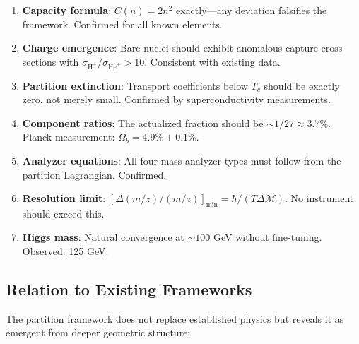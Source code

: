\documentclass[twocolumn,10pt,a4paper]{article}
\theoremstyle{definition}
\theoremstyle{remark}
\newcommand{\Depth}{\mathcal{M}}
\begin{document}
\begin{enumerate}
    \item \textbf{Capacity formula}: $C(n) = 2n^2$ exactly---any deviation falsifies the framework. Confirmed for all known elements.

    \item \textbf{Charge emergence}: Bare nuclei should exhibit anomalous capture cross-sections with $\sigma_{\text{H}^+}/\sigma_{\text{He}^+} > 10$. Consistent with existing data.

    \item \textbf{Partition extinction}: Transport coefficients below $T_c$ should be exactly zero, not merely small. Confirmed by superconductivity measurements.

    \item \textbf{Component ratios}: The actualized fraction should be $\sim 1/27 \approx 3.7\%$. Planck measurement: $\Omega_b = 4.9\% \pm 0.1\%$.

    \item \textbf{Analyzer equations}: All four mass analyzer types must follow from the partition Lagrangian. Confirmed.

    \item \textbf{Resolution limit}: $[\Delta(m/z)/(m/z)]_{\min} = \hbar/(T\Delta\Depth)$. No instrument should exceed this.

    \item \textbf{Higgs mass}: Natural convergence at $\sim 100$ GeV without fine-tuning. Observed: 125 GeV.
\end{enumerate}

\subsection{Relation to Existing Frameworks}

The partition framework does not replace established physics but reveals it as emergent from deeper geometric structure:
\end{document}
